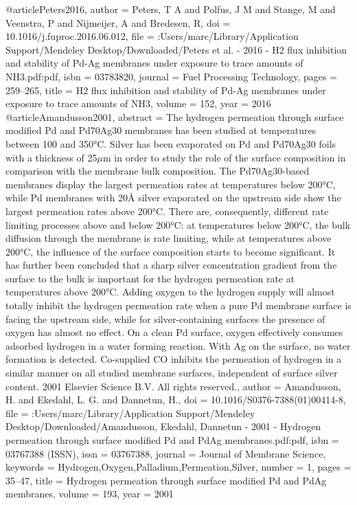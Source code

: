 @article{Peters2016,
author = {Peters, T A and Polfus, J M and Stange, M and Veenstra, P and Nijmeijer, A and Bredesen, R},
doi = {10.1016/j.fuproc.2016.06.012},
file = {:Users/marc/Library/Application Support/Mendeley Desktop/Downloaded/Peters et al. - 2016 - H2 flux inhibition and stability of Pd-Ag membranes under exposure to trace amounts of NH3.pdf:pdf},
isbn = {03783820},
journal = {Fuel Processing Technology},
pages = {259--265},
title = {{H2 flux inhibition and stability of Pd-Ag membranes under exposure to trace amounts of NH3}},
volume = {152},
year = {2016}
}
@article{Amandusson2001,
abstract = {The hydrogen permeation through surface modified Pd and Pd70Ag30 membranes has been studied at temperatures between 100 and 350°C. Silver has been evaporated on Pd and Pd70Ag30 foils with a thickness of 25$\mu$m in order to study the role of the surface composition in comparison with the membrane bulk composition. The Pd70Ag30-based membranes display the largest permeation rates at temperatures below 200°C, while Pd membranes with 20{\AA} silver evaporated on the upstream side show the largest permeation rates above 200°C. There are, consequently, different rate limiting processes above and below 200°C: at temperatures below 200°C, the bulk diffusion through the membrane is rate limiting, while at temperatures above 200°C, the influence of the surface composition starts to become significant. It has further been concluded that a sharp silver concentration gradient from the surface to the bulk is important for the hydrogen permeation rate at temperatures above 200°C. Adding oxygen to the hydrogen supply will almost totally inhibit the hydrogen permeation rate when a pure Pd membrane surface is facing the upstream side, while for silver-containing surfaces the presence of oxygen has almost no effect. On a clean Pd surface, oxygen effectively consumes adsorbed hydrogen in a water forming reaction. With Ag on the surface, no water formation is detected. Co-supplied CO inhibits the permeation of hydrogen in a similar manner on all studied membrane surfaces, independent of surface silver content. {\textcopyright} 2001 Elsevier Science B.V. All rights reserved.},
author = {Amandusson, H. and Ekedahl, L. G. and Dannetun, H.},
doi = {10.1016/S0376-7388(01)00414-8},
file = {:Users/marc/Library/Application Support/Mendeley Desktop/Downloaded/Amandusson, Ekedahl, Dannetun - 2001 - Hydrogen permeation through surface modified Pd and PdAg membranes.pdf:pdf},
isbn = {03767388 (ISSN)},
issn = {03767388},
journal = {Journal of Membrane Science},
keywords = {Hydrogen,Oxygen,Palladium,Permeation,Silver},
number = {1},
pages = {35--47},
title = {{Hydrogen permeation through surface modified Pd and PdAg membranes}},
volume = {193},
year = {2001}
}
